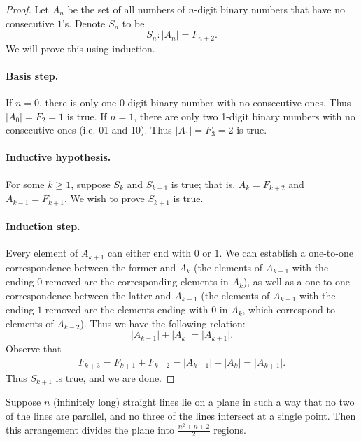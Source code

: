 \documentclass{exam}
\begin{document}
\begin{proof}
    Let $A_n$ be the set of all numbers of $n$-digit binary numbers that have no consecutive $1$'s. Denote $S_n$ to be $$S_n: \lvert A_n\rvert = F_{n+2}.$$ We will prove this using induction.

    \paragraph{Basis step.} If $n=0$, there is only one 0-digit binary number with no consecutive ones. Thus $\lvert A_0\rvert = F_2 = 1$ is true. If $n=1$, there are only two 1-digit binary numbers with no consecutive ones (i.e. 01 and 10). Thus $\lvert A_1\rvert = F_3 = 2$ is true.

    \paragraph{Inductive hypothesis.} For some $k\ge1$, suppose $S_k$ and $S_{k-1}$ is true; that is, $A_k = F_{k+2}$ and $A_{k-1} = F_{k+1}$. We wish to prove $S_{k+1}$ is true.

    \paragraph{Induction step.} Every element of $A_{k+1}$ can either end with $0$ or $1$. We can establish a one-to-one correspondence between the former and $A_{k}$ (the elements of $A_{k+1}$ with the ending $0$ removed are the corresponding elements in $A_{k}$), as well as a one-to-one correspondence between the latter and $A_{k-1}$ (the elements of $A_{k+1}$ with the ending $1$ removed are the elements ending with $0$ in $A_k$, which correspond to elements of $A_{k-2}$). Thus we have the following relation: $$\lvert A_{k-1}\rvert + \lvert A_{k}\rvert = \lvert A_{k+1}\rvert.$$ Observe that
    \begin{align*}
        F_{k+3} = F_{k+1} + F_{k+2} = \lvert A_{k-1}\rvert + \lvert A_k\rvert = \lvert A_{k+1}\rvert.
    \end{align*}
    Thus $S_{k+1}$ is true, and we are done.
\end{proof}

\begin{proposition}{10.33}
    Suppose $n$ (infinitely long) straight lines lie on a plane in such a way that no two of the lines are parallel, and no three of the lines intersect at a single point. Then this arrangement divides the plane into $\frac{n^2+n+2}2$ regions.
\end{proposition}
\end{document}
